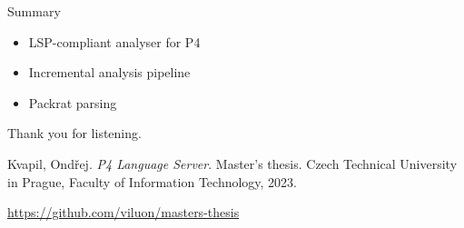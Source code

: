 \documentclass[aspectratio=169]{beamer}
\begin{document}
\begin{frame}{Summary}
	\begin{itemize}
		\item LSP-compliant analyser for P4 \pause
		\item Incremental analysis pipeline \pause
		\item Packrat parsing
	\end{itemize}
\end{frame}

\begin{frame}{}
	Thank you for listening.

	\begin{thebibliography}{1}
		Kvapil, Ondřej.
		\textit{P4 Language Server}.
		Master's thesis.
		Czech Technical University in Prague,
		Faculty of Information Technology, 2023.
	\end{thebibliography}

	\url{https://github.com/viluon/masters-thesis}
\end{frame}
\end{document}
